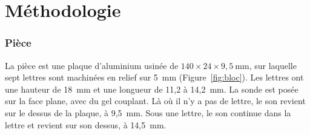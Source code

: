 \documentclass[11pt,letterpaper]{article}
\begin{document}
\section{Méthodologie}
\label{sec:methodologie}

\subsubsection*{Pièce}
La pièce est une plaque d'aluminium usinée de $140 \times 24 \times 9{,}5~\text{mm}$, sur laquelle sept lettres sont machinées en relief sur 5~mm (Figure~\ref{fig:bloc}). Les lettres ont une hauteur de 18~mm et une longueur de 11,2 à 14,2~mm. La sonde est posée sur la face plane, avec du gel couplant. Là où il n'y a pas de lettre, le son revient sur le dessus de la plaque, à 9,5~mm. Sous une lettre, le son continue dans la lettre et revient sur son dessus, à 14,5~mm.
\end{document}
